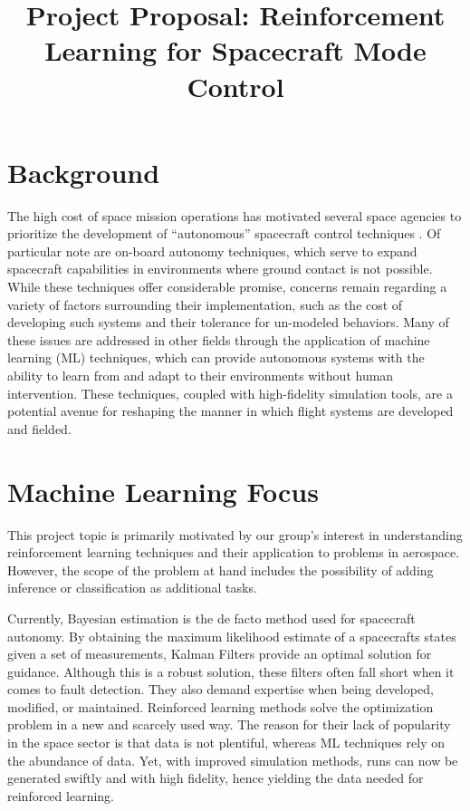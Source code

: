 \documentclass[]{article}
\title{Project Proposal: Reinforcement Learning for Spacecraft Mode Control}
\author{}
\begin{document}
\maketitle

\begin{abstract}

\end{abstract}

\section{Background}

The high cost of space mission operations has motivated several space agencies to prioritize the development of ``autonomous'' spacecraft control techniques \cite{Pecheur2000}. Of particular note are on-board autonomy techniques, which serve to expand spacecraft capabilities in environments where ground contact is not possible. While these techniques offer considerable promise, concerns remain regarding a variety of factors surrounding their implementation, such as the cost of developing such systems and their tolerance for un-modeled behaviors\cite{Starek2016}. Many of these issues are addressed in other fields through the application of machine learning (ML) techniques, which can provide autonomous systems with the ability to learn from and adapt to their environments without human intervention. These techniques, coupled with high-fidelity simulation tools, are a potential avenue for reshaping the manner in which flight systems are developed and fielded. 



\section{Machine Learning Focus}

This project topic is primarily motivated by our group's interest in understanding reinforcement learning techniques and their application to problems in aerospace. However, the scope of the problem at hand includes the possibility of adding inference or classification as additional tasks.

Currently, Bayesian estimation is the de facto method used for spacecraft autonomy. By obtaining the maximum likelihood estimate of a spacecrafts states given a set of measurements, Kalman Filters provide an optimal solution for guidance. Although this is a robust solution, these filters often fall short when it comes to fault detection. They also demand expertise when being developed, modified, or maintained. Reinforced learning methods solve the optimization problem in a new and scarcely used way. The reason for their lack of popularity in the space sector is that data is not plentiful, whereas ML techniques rely on the abundance of data. Yet, with improved simulation methods, runs can now be generated swiftly and with high fidelity, hence yielding the data needed for reinforced learning. 
\end{document}
